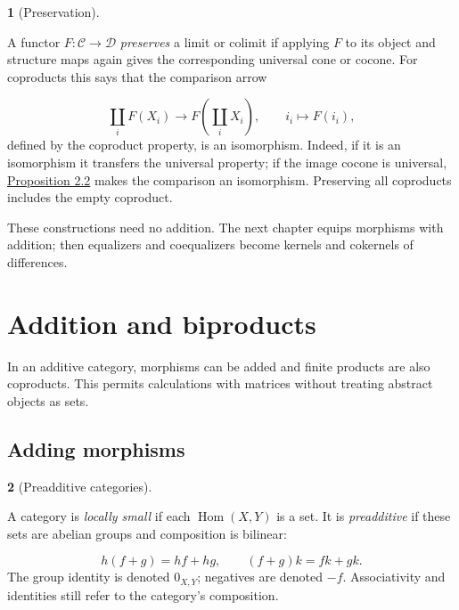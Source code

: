 \documentclass[11pt,a4paper]{article}
\newcommand{\mathheading}{}
\theoremstyle{plain}
\theoremstyle{definition}
\newtheorem*{definitionstatement}{\mathheading}
\newenvironment{mathdefinition}[3]{\renewcommand{\mathheading}{#1 #2}\begin{definitionstatement}[#3]}{\end{definitionstatement}}
\begin{document}
\begin{mathdefinition}{Definition}{2.11}{Preservation}
\label{env-2-11}

A functor \(F:\mathcal C\to\mathcal D\) \emph{preserves} a limit or colimit if applying \(F\) to its object and structure maps again gives the corresponding universal cone or cocone. For coproducts this says that the comparison arrow

\[\coprod_iF(X_i)\longrightarrow F(\coprod_iX_i),\qquad i_i\longmapsto F(i_i),\] 
defined by the coproduct property, is an isomorphism. Indeed, if it is an isomorphism it transfers the universal property; if the image cocone is universal, \hyperref[env-2-2]{Proposition 2.2} makes the comparison an isomorphism. Preserving all coproducts includes the empty coproduct.


\par{}\par

\end{mathdefinition}
 
These constructions need no addition. The next chapter equips morphisms with addition; then equalizers and coequalizers become kernels and cokernels of differences.

 
\section{Addition and biproducts}
\label{chapter-03}
 
In an additive category, morphisms can be added and finite products are also coproducts. This permits calculations with matrices without treating abstract objects as sets.


\subsection{Adding morphisms}

\begin{mathdefinition}{Definition}{3.1}{Preadditive categories}
\label{env-3-1}

A category is \emph{locally small} if each \(\operatorname{Hom}(X,Y)\) is a set. It is \emph{preadditive} if these sets are abelian groups and composition is bilinear:

\[h(f+g)=hf+hg,\qquad (f+g)k=fk+gk.\] 
The group identity is denoted \(0_{X,Y}\); negatives are denoted \(-f\). Associativity and identities still refer to the category's composition.


\par{}\par

\end{mathdefinition}
 
\end{document}
